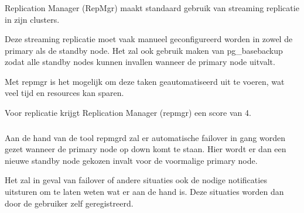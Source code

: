 
\subsubsection{}
\label{subsubsec:Ondersteuning van replicatie}

Replication Manager (RepMgr) maakt standaard gebruik van streaming replicatie in zijn clusters.

Deze streaming replicatie moet vaak manueel geconfigureerd worden in zowel de primary als de standby node. Het zal ook gebruik maken van pg\_basebackup zodat alle standby nodes kunnen invallen wanneer de primary node uitvalt.

Met repmgr is het mogelijk om deze taken geautomatiseerd uit te voeren, wat veel tijd en resources kan sparen.

Voor replicatie krijgt Replication Manager (repmgr) een score van 4.

\subsubsection{}
\label{subsubsec:Ondersteuning van failover}


Aan de hand van de tool repmgrd zal er automatische failover in gang worden gezet wanneer de primary node op down komt te staan. Hier wordt er dan een nieuwe standby node gekozen invalt voor de voormalige primary node.  

Het zal in geval van failover of andere situaties ook de nodige notificaties uitsturen om te laten weten wat er aan de hand is. Deze situaties worden dan door de gebruiker zelf geregistreerd.


